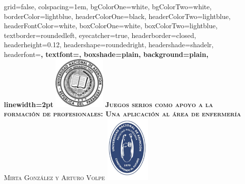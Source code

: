 \documentclass[portrait,final,a0paper,fontscale=0.277]{baposter}
\begin{document}
\begin{poster}%
  {
  grid=false,
  colspacing=1em,
  bgColorOne=white,
  bgColorTwo=white,
  borderColor=lightblue,
  headerColorOne=black,
  headerColorTwo=lightblue,
  headerFontColor=white,
  boxColorOne=white,
  boxColorTwo=lightblue,
  textborder=roundedleft,
  eyecatcher=true,
  headerborder=closed,
  headerheight=0.12\textheight,
  headershape=roundedright,
  headershade=shadelr,
  headerfont=\Large\bf\textsc, %
  textfont={\setlength{\parindent}{1.5em}},
  boxshade=plain,
  background=plain,
  linewidth=2pt
  }
  {\includegraphics[height=7em]{imagenes/logouna.png}} 
  {\bf\textsc{Juegos serios como apoyo a la formación de profesionales: Una aplicación al área de enfermería}\vspace{0.5em}}
  {\textsc{ Mirta González y Arturo Volpe }}
  {%
    \includegraphics[height=9em]{imagenes/logopol.png}
  }

    \newcommand{\colouredcircle}{%
      \tikz{\useasboundingbox (-0.2em,-0.32em) rectangle(0.2em,0.32em);
          \draw[draw=black,fill=lightblue,line width=0.03em] (0,0) circle(0.18em);}\-\ }


\end{poster}
\end{document}
